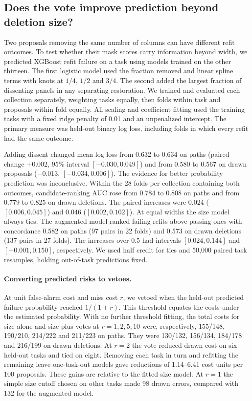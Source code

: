 \subsection{Does the vote improve prediction beyond deletion size?}
\label{sec:incremental}
Two proposals removing the same number of columns can have different refit outcomes. To test whether their mask scores carry information beyond width, we predicted XGBoost refit failure on a task using models trained on the other thirteen. The first logistic model used the fraction removed and linear spline terms with knots at $1/4$, $1/2$ and $3/4$. The second added the largest fraction of dissenting panels in any separating restoration. We trained and evaluated each collection separately, weighting tasks equally, then folds within task and proposals within fold equally. All scaling and coefficient fitting used the training tasks with a fixed ridge penalty of 0.01 and an unpenalized intercept. The primary measure was held-out binary log loss, including folds in which every refit had the same outcome.

Adding dissent changed mean log loss from 0.632 to 0.634 on paths (paired change $+0.002$, 95\% interval $[-0.030,0.049]$) and from 0.580 to 0.567 on drawn proposals ($-0.013$, $[-0.034,0.006]$). The evidence for better probability prediction was inconclusive. Within the 28 folds per collection containing both outcomes, candidate-ranking AUC rose from 0.784 to 0.808 on paths and from 0.779 to 0.825 on drawn deletions. The paired increases were 0.024 ($[0.006,0.045]$) and 0.046 ($[0.002,0.102]$). At equal widths the size model always ties. The augmented model ranked failing refits above passing ones with concordance 0.582 on paths (97 pairs in 22 folds) and 0.573 on drawn deletions (137 pairs in 27 folds). The increases over 0.5 had intervals $[0.024,0.144]$ and $[-0.001,0.150]$, respectively. We used half credit for ties and 50,000 paired task resamples, holding out-of-task predictions fixed.

\paragraph{Converting predicted risks to vetoes.}
At unit false-alarm cost and miss cost $r$, we vetoed when the held-out predicted failure probability reached $1/(1+r)$. This threshold equates the costs under the estimated probability. With no further threshold fitting, the total costs for size alone and size plus votes at $r=1,2,5,10$ were, respectively, 155/148, 190/210, 214/222 and 211/223 on paths. They were 130/132, 156/134, 184/178 and 216/199 on drawn deletions. At $r=2$ the vote reduced drawn cost on six held-out tasks and tied on eight. Removing each task in turn and refitting the remaining leave-one-task-out models gave reductions of 1.14--6.41 cost units per 100 proposals. These gains are relative to the fitted size model. At $r=1$ the simple size cutoff chosen on other tasks made 98 drawn errors, compared with 132 for the augmented model.

